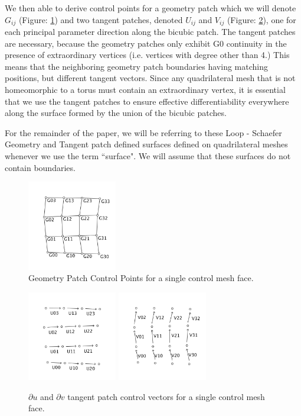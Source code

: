 \documentclass[12pt, letterpaper]{article}
\begin{document}
		We then able to derive control points for a geometry patch which we will denote $G_{ij}$ (Figure: \ref{fig:G}) and two tangent patches,
		denoted $U_{ij}$ and $V_{ij}$ (Figure: \ref{fig:dUdV}), one for each principal parameter direction along the bicubic patch.
		The tangent patches are necessary, because the geometry patches only exhibit G0 continuity in the presence of extraordinary vertices (i.e. 
		vertices with degree other than 4.)
		This means that the neighboring geometry patch boundaries having matching positions, but different tangent vectors.
		Since any quadrilateral mesh that is not homeomorphic to a torus must contain an extraordinary vertex,
		it is essential that we use the tangent patches to ensure effective differentiability everywhere along the surface formed by the union of the bicubic patches.
		
		For the remainder of the paper, we will be referring to these Loop - Schaefer Geometry and Tangent patch defined surfaces defined on quadrilateral meshes
		whenever we use the term ``surface". We will assume that these surfaces do not contain boundaries.

		\begin{figure}[h]
		\centering
		\includegraphics[width=0.35\textwidth]{GeometryPatchControlPoints}
		\caption{Geometry Patch Control Points for a single control mesh face.}
		\label{fig:G}
		\end{figure}

		\begin{figure}[h]
		\centering
		\includegraphics[width=0.35\textwidth]{duPatch}
		\includegraphics[width=0.35\textwidth]{dvPatch}
		\caption{$\partial u$ and $\partial v$ tangent patch control vectors for a single control mesh face.}
		\label{fig:dUdV}
		\end{figure}
\end{document}
